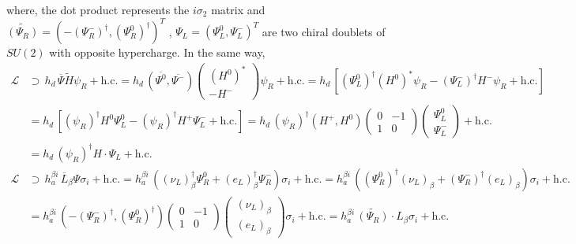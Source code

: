\documentclass[12pt,letterpaper]{article}
\begin{document}
where, the dot product represents the $i\sigma_2$ matrix and $\widetilde{(\Psi_R)}=(-(\Psi^-_R)^\dagger,(\Psi^0_R)^\dagger)^T$ , $\Psi_L=(\Psi^0_L,\Psi^-_L)^T$ are two chiral doublets of $SU(2)$ with opposite hypercharge.
In the same way, 
\begin{align}
\label{eq:hd-term}
\mathcal{L} & \supset \, 
h_d\,\overline{\Psi}\widetilde{H}\psi_{R} 
+ \text{h.c.} 
= h_d\, (\overline{\Psi^0},\overline{\Psi^-})\begin{pmatrix}
(H^0)^* \\ -H^-
\end{pmatrix}\psi_R + \text{h.c.} 
=h_d\, \left[(\Psi^0_L)^\dagger(H^0)^*\psi_R  - (\Psi^-_L)^\dagger H^-\psi_R  + \text{h.c.}\right] \nonumber \\
&=h_d\, \left[(\psi_R )^\dagger H^0 \Psi_L^0 - (\psi_R )^\dagger H^+ \Psi_L^-  + \text{h.c.}\right]
=h_d\,(\psi_R )^\dagger (H^+,H^0)\begin{pmatrix}
0 & -1 \\
1 & 0
\end{pmatrix}\begin{pmatrix}
\Psi_L^0 \\ \Psi_L^-
\end{pmatrix} + \text{h.c.} \nonumber \\
&=h_d\, (\psi_R )^\dagger H\cdot\Psi_L + \text{h.c.} 
\end{align}
\begin{align}
\label{eq:ha-term}
\mathcal{L} & \supset\,
 h_a^{\beta i}\, \overline{L}_\beta \Psi \sigma_i + \text{h.c.} 
=  h_a^{\beta i}\,\left((\nu_L)_\beta^\dagger\Psi_R^0 + (e_L)_\beta^{\dagger}\Psi_R^- \right)\sigma_i  + \text{h.c.}
=  h_a^{\beta i}\,\left((\Psi_R^0)^\dagger(\nu_L)_\beta + (\Psi_R^-)^{\dagger}(e_L)_\beta \right)\sigma_i  + \text{h.c.}\nonumber\\
&= h_a^{\beta i}\,(-(\Psi_R^-)^{\dagger},(\Psi_R^0)^\dagger)\begin{pmatrix}
0 & -1 \\
1 & 0
\end{pmatrix}\begin{pmatrix}
(\nu_L)_\beta \\ (e_L)_\beta
\end{pmatrix}\sigma_i + \text{h.c.} 
=  h_a^{\beta i}\,\widetilde{(\Psi_R)}\cdot L_\beta \sigma_i + \text{h.c.}
\end{align}
\end{document}
